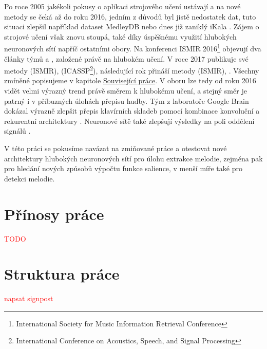 Po roce 2005 jakékoli pokusy o aplikaci strojového učení ustávají a na nové metody se čeká až do roku 2016, jedním z důvodů byl jistě nedostatek dat, tuto situaci zlepšil například dataset MedleyDB \citep{Bittner2014} nebo dnes již zaniklý iKala \citep{Chan2015}. Zájem o strojové učení však znovu stoupá, také díky úspěšnému využití hlubokých neuronových sítí napříč ostatními obory. Na konferenci ISMIR 2016\footnote{International Society for Music Information Retrieval Conference} objevují dva články týmů \cite{Kum2016} a \cite{Rigaud2016}, založené právě na hlubokém učení. V roce 2017 publikuje své metody \cite{Bittner2017} (ISMIR), \cite{Balke2017} (ICASSP\footnote{International Conference on Acoustics, Speech, and Signal Processing}), následující rok přináší metody \cite{DBasaranSEssid2018} (ISMIR), \cite{Bittner2018}. Všechny zmíněné popisujeme v kapitole \hyperref[chap:souvisejici]{Související práce}. V oboru lze tedy od roku 2016 vidět velmi výrazný trend právě směrem k hlubokému učení, a stejný směr je patrný i v příbuzných úlohách přepisu hudby. Tým z laboratoře Google Brain dokázal výrazně zlepšit přepis klavírních skladeb pomocí kombinace konvoluční a rekurentní architektury \citep{Hawthorne2018}. Neuronové sítě také zlepšují výsledky na poli oddělení signálů \citep{Stoller2018}.

V této práci se pokusíme navázat na zmiňované práce a otestovat nové architektury hlubokých neuronových sítí pro úlohu extrakce melodie, zejména pak pro hledání nových způsobů výpočtu funkce salience, v menší míře také pro detekci melodie.

\section{Přínosy práce}

\textcolor{red}{TODO}

\section{Struktura práce}

\textcolor{red}{napsat signpost}


